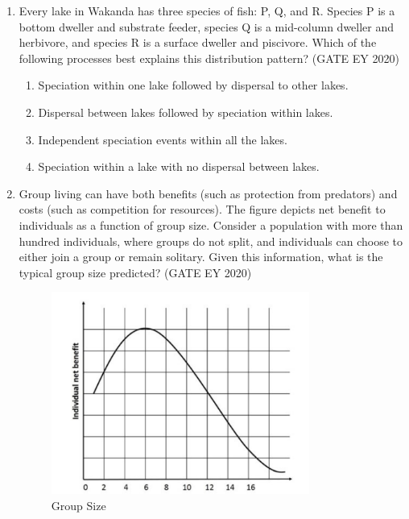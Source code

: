 \begin{enumerate}
\item Every lake in Wakanda has three species of fish: P, Q, and R. Species P is a bottom dweller and substrate feeder, species Q is a mid-column dweller and herbivore, and species R is a surface dweller and piscivore. Which of the following processes best explains this distribution pattern? \hfill {(GATE EY 2020)}
\begin{multicols}{2}
\begin{enumerate}
\item Speciation within one lake followed by dispersal to other lakes.
\item Dispersal between lakes followed by speciation within lakes.
\item Independent speciation events within all the lakes.
\item Speciation within a lake with no dispersal between lakes.
\end{enumerate}
\end{multicols}
\item
Group living can have both benefits (such as protection from predators) and costs (such as competition for resources). The figure depicts net benefit to individuals as a function of group size. Consider a population with more than hundred individuals, where groups do not split, and individuals can choose to either join a group or remain solitary. Given this information, what is the typical group size predicted? \hfill {(GATE EY 2020)}

\begin{center}
\begin{figure}[H]
    \includegraphics[width=0.8\textwidth]{figs/fig6.png}
\caption{Group Size}
\label{fig:q31}
\end{figure}
\end{center}


\end{enumerate}
